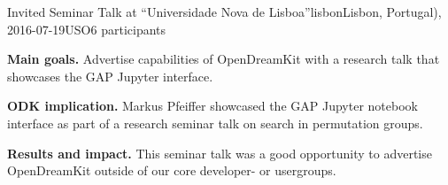\begin{event}{Invited Seminar Talk at ``Universidade Nova de
    Lisboa''}{lisbon}{Lisbon, Portugal), 2016-07-19}{USO}{6 participants}{}

\textbf{Main goals.} Advertise capabilities of OpenDreamKit with a research talk
that showcases the GAP Jupyter interface.

\textbf{ODK implication.} Markus Pfeiffer showcased the GAP Jupyter notebook
interface as part of a research seminar talk on search in permutation groups.

\textbf{Results and impact.} 
This seminar talk was a good opportunity to advertise OpenDreamKit outside of
our core developer- or usergroups.

\end{event}
